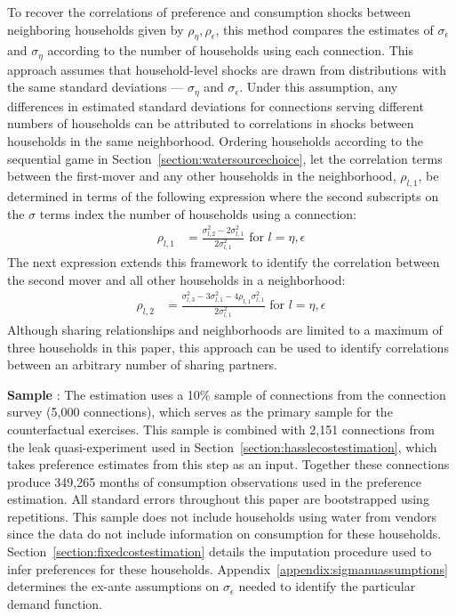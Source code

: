 \documentclass[12pt]{article}
\begin{document}
To recover the correlations of preference and consumption shocks between neighboring households given by $\rho_{\eta}, \rho_{\epsilon}$, this method compares the estimates of $\sigma_{\epsilon}$ and $\sigma_{\eta}$ according to the number of households using each connection.  This approach assumes that household-level shocks are drawn from distributions with the same standard deviations --- $\sigma_{\eta}$ and $\sigma_{\epsilon}$.  Under this assumption, any differences in estimated standard deviations for connections serving different numbers of households can be attributed to correlations in shocks between households in the same neighborhood.  Ordering households according to the sequential game in Section~\ref{section:watersourcechoice}, let the correlation terms between the first-mover and any other households in the neighborhood, $\rho_{l,1}$, be determined in terms of the following expression where the second subscripts on the $\sigma$ terms index the number of households using a connection:
\begin{align*}
\rho_{l,1} &= \frac{\sigma_{l,2}^2 - 2\sigma_{l,1}^2}{2\sigma_{l,1}^2} \text{ for } l =  \eta, \epsilon 
\end{align*}
The next expression extends this framework to identify the correlation between the second mover and all other households in a neighborhood:
\begin{align*}
\rho_{l,2} &= \frac{\sigma_{l,3}^2 - 3\sigma_{l,1}^2- 4 \rho_{l,1} \sigma_{l,1}^2 }{2\sigma_{l,1}^2 } \text{ for } l =  \eta, \epsilon
\end{align*}
Although sharing relationships and neighborhoods are limited to a maximum of three households in this paper, this approach can be used to identify correlations between an arbitrary number of sharing partners.

\textbf{Sample} : The estimation uses a 10\% sample of connections from the connection survey (5,000 connections), which serves as the primary sample for the counterfactual exercises.  This sample is combined with 2,151 connections from the leak quasi-experiment used in Section~\ref{section:hasslecostestimation}, which takes preference estimates from this step as an input.  Together these connections produce 349,265 months of consumption observations used in the preference estimation.  All standard errors throughout this paper are bootstrapped using repetitions.  This sample does not include households using water from vendors since the data do not include information on consumption for these households.  Section~\ref{section:fixedcostestimation} details the imputation procedure used to infer preferences for these households.  Appendix~\ref{appendix:sigmanuassumptions} determines the ex-ante assumptions on $\sigma_{\epsilon}$ needed to identify the particular demand function.
\end{document}
